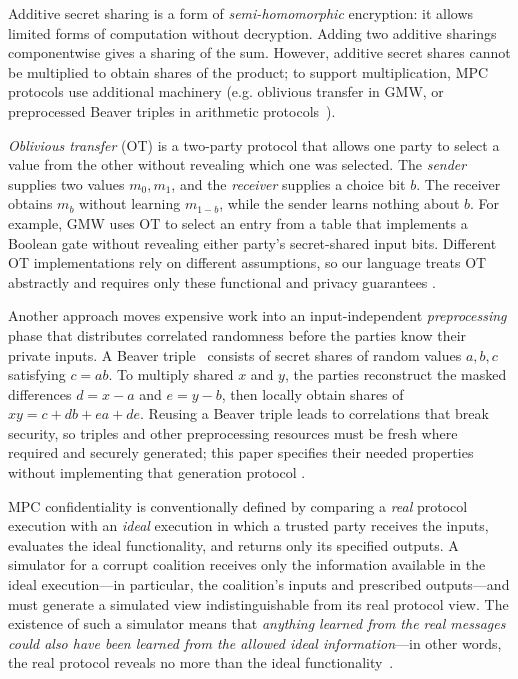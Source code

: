 Additive secret sharing is a form of \emph{semi-homomorphic}
encryption: it allows limited forms of computation without decryption.
Adding two additive sharings componentwise gives a sharing of the sum.
However, additive secret shares cannot be multiplied to obtain shares
of the product; to support multiplication, MPC protocols use
additional machinery (e.g. oblivious transfer in GMW, or preprocessed
Beaver triples in arithmetic protocols~\cite{goldreich1987play,
  evans2018pragmatic, BDOZ,10.1007/978-3-030-68869-1_3}).

\emph{Oblivious transfer} (OT) is a two-party protocol that allows one
party to select a value from the other without revealing which one was
selected. The \emph{sender} supplies two values $m_0,m_1$, and the
\emph{receiver} supplies a choice bit $b$. The receiver obtains $m_b$
without learning $m_{1-b}$, while the sender learns nothing about $b$.
For example, GMW uses OT to select an entry from a table that
implements a Boolean gate without revealing either party's
secret-shared input bits. Different OT implementations rely on
different assumptions, so our language treats OT abstractly and
requires only these functional and privacy guarantees
\cite{goldreich1987play, evans2018pragmatic}.

Another approach moves expensive work into an input-independent
\emph{preprocessing} phase that distributes correlated randomness
before the parties know their private inputs. A Beaver
triple~\cite{beaver1991efficient} consists of secret shares of random
values $a,b,c$ satisfying $c=ab$. To multiply shared $x$ and $y$, the
parties reconstruct the masked differences $d=x-a$ and $e=y-b$, then
locally obtain shares of $xy=c+db+ea+de$. Reusing a Beaver triple
leads to correlations that break security, so triples and other
preprocessing resources must be fresh where required and securely
generated; this paper specifies their needed properties without
implementing that generation protocol \cite{evans2018pragmatic,
  BDOZ,10.1007/978-3-030-68869-1_3}.

MPC confidentiality is conventionally defined by comparing a
\emph{real} protocol execution with an \emph{ideal} execution in which
a trusted party receives the inputs, evaluates the ideal
functionality, and returns only its specified outputs. A simulator for
a corrupt coalition receives only the information available in the
ideal execution---in particular, the coalition's inputs and prescribed
outputs---and must generate a simulated view indistinguishable from
its real protocol view. The existence of such a simulator means that
\emph{anything learned from the real messages could also have been
  learned from the allowed ideal information}---in other words, the
real protocol reveals no more than the ideal
functionality~\cite{Lindell2017}.

